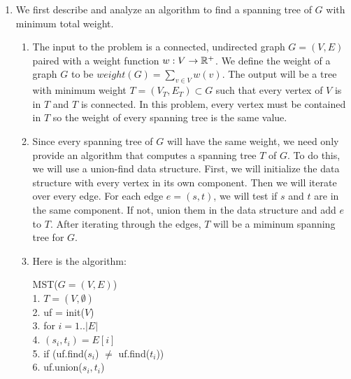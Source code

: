\documentclass{article}
\begin{document}
\begin{enumerate}[label=(\alph*)]
    \item We first describe and analyze an algorithm to find a spanning tree of $G$ with minimum total weight.
        \begin{enumerate}[label=\alph*)]
            \item The input to the problem is a connected, undirected graph $G = (V, E)$ paired with a weight function $w: V \rightarrow {\mathbb R} ^+$.
            We define the weight of a graph $G$ to be $weight(G) = \sum _{v \in V} w(v)$. \parspace
            The output will be a tree with minimum weight $T = (V_T, E_T) \subset G$ such that every vertex of $V$ is in $T$ and $T$ is connected.
            In this problem, every vertex must be contained in $T$ so the weight of every spanning tree is the same value.
            \item Since every spanning tree of $G$ will have the same weight, we need only provide an algorithm that computes a spanning tree $T$ of $G$.
            To do this, we will use a union-find data structure.
            First, we will initialize the data structure with every vertex in its own component.
            Then we will iterate over every edge.
            For each edge $e = (s, t)$, we will test if $s$ and $t$ are in the same component.
            If not, union them in the data structure and add $e$ to $T$.
            After iterating through the edges, $T$ will be a miminum spanning tree for $G$.
            \item Here is the algorithm:
            \begin{algorithm}
                \textsc{MST}($G = (V, E)$) \\
                1. \hspace{1em} $T = (V, \emptyset)$ \\
                2. \hspace{1em} uf = init($V$) \\
                3. \hspace{1em} for $i=1..|E|$ \\
                4. \hspace{2em}     $(s_i, t_i) = E[i]$ \\
                5. \hspace{2em}     if (uf.find($s_i$) $\neq$ uf.find($t_i$)) \\
                6. \hspace{3em}         uf.union($s_i, t_i$) \\

\end{algorithm}
\end{enumerate}
\end{enumerate}
\end{document}
